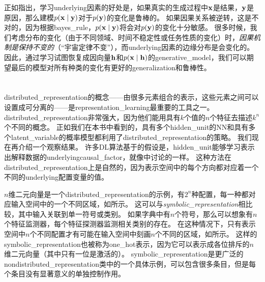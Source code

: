 
正如\cite{Janzing-et-al-ICML2012}指出，学习\gls{underlying}因素的好处是，如果真实的生成过程中$\mathbf{x}$是结果，$\mathbf{y}$是原因，那么建模$p(\mathbf{x} \mid \mathbf{y})$对于$p(\mathbf{y})$的变化是鲁棒的。
如果因果关系被逆转，这是不对的，因为根据\gls{bayes_rule}，$p(\mathbf{x} \mid \mathbf{y})$将会对$p(\mathbf{y})$的变化十分敏感。
很多时候，我们考虑分布的变化（由于不同领域、时间不稳定性或任务性质的变化）时，\emph{因果机制是保持不变的}（``宇宙定律不变''），而\gls{underlying}因素的边缘分布是会变化的。
因此，通过学习试图恢复成因向量$\mathbf{h}$和$p(\mathbf{x} \mid \mathbf{h})$的\gls{generative_model}，我们可以期望最后的模型对所有种类的变化有更好的\gls{generalization}和鲁棒性。


\section{}
\label{sec:distributed_representation}

\gls{distributed_representation}的概念——由很多元素组合的表示，这些元素之间可以设置成可分离的——是\gls{representation_learning}最重要的工具之一。
\gls{distributed_representation}非常强大，因为他们能用具有$k$个值的$n$个特征去描述$k^n$个不同的概念。
正如我们在本书中看到的，具有多个\gls{hidden_unit}的\gls{NN}和具有多个\gls{latent_variable}的概率模型都利用了\gls{distributed_representation}的策略。
我们现在再介绍一个观察结果。
许多\gls{DL}算法基于的假设是，\gls{hidden_unit}能够学习表示出解释数据的\gls{underlying}\gls{causal_factor}，就像中讨论的一样。
这种方法在\gls{distributed_representation}上是自然的，因为表示空间中的每个方向都对应着一个不同的\gls{underlying}配置变量的值。


$n$维二元向量是一个\gls{distributed_representation}的示例，有$2^n$种配置，每一种都对应输入空间中的一个不同区域，如所示。
这可以与\emph{\gls{symbolic_representation}}相比较，其中输入关联到单一符号或类别。
如果字典中有$n$个符号，那么可以想象有$n$个特征监测器，每个特征探测器监测相关类别的存在。
在这种情况下，只有表示空间中$n$个不同配置才有可能在输入空间中刻画$n$个不同的区域，如所示。
这样的\gls{symbolic_representation}也被称为\gls{one_hot}表示，因为它可以表示成各位排斥的$n$维二元向量（其中只有一位是激活的）。
\gls{symbolic_representation}是更广泛的\gls{nondistributed_representation}类中的一个具体示例，可以包含很多条目，但是每个条目没有显著意义的单独控制作用。


